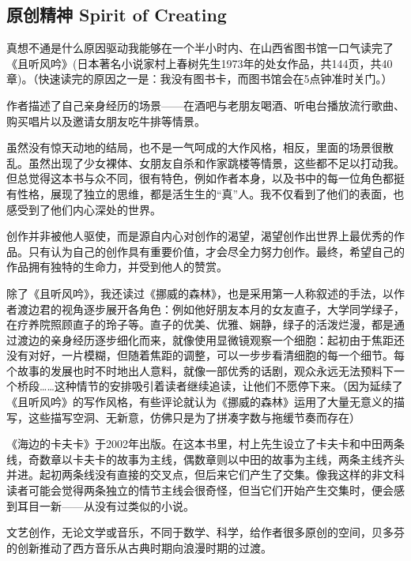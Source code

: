 \hypertarget{ux521bux9020ux7684ux7cbeux795e-spirit-of-creating}{%
\subsection{原创精神 Spirit of Creating }\label{ux521bux9020ux7684ux7cbeux795e-spirit-of-creating}}

真想不通是什么原因驱动我能够在一个半小时内、在山西省图书馆一口气读完了《且听风吟》(日本著名小说家村上春树先生1973年的处女作品，共144页，共40章)。（快速读完的原因之一是：我没有图书卡，而图书馆会在5点钟准时关门。）

作者描述了自己亲身经历的场景——在酒吧与老朋友喝酒、听电台播放流行歌曲、购买唱片以及邀请女朋友吃牛排等情景。

虽然没有惊天动地的结局，也不是一气呵成的大作风格，相反，里面的场景很散乱。虽然出现了少女裸体、女朋友自杀和作家跳楼等情景，这些都不足以打动我。但总觉得这本书与众不同，很有特色，例如作者本身，以及书中的每一位角色都挺有性格，展现了独立的思维，都是活生生的“真”人。我不仅看到了他们的表面，也感受到了他们内心深处的世界。

创作并非被他人驱使，而是源自内心对创作的渴望，渴望创作出世界上最优秀的作品。只有认为自己的创作具有重要价值，才会尽全力努力创作。最终，希望自己的作品拥有独特的生命力，并受到他人的赞赏。

除了《且听风吟》，我还读过《挪威的森林》，也是采用第一人称叙述的手法，以作者渡边君的视角逐步展开各角色：例如他好朋友本月的女友直子，大学同学绿子，在疗养院照顾直子的玲子等。直子的优美、优雅、娴静，绿子的活泼烂漫，都是通过渡边的亲身经历逐步细化而来，就像使用显微镜观察一个细胞：起初由于焦距还没有对好，一片模糊，但随着焦距的调整，可以一步步看清细胞的每一个细节。每个故事的发展也时不时地出人意料，就像一部优秀的话剧，观众永远无法预料下一个桥段……这种情节的安排吸引着读者继续追读，让他们不愿停下来。（因为延续了《且听风吟》的写作风格，有些评论就认为《挪威的森林》运用了大量无意义的描写，这些描写空洞、无新意，仿佛只是为了拼凑字数与拖缓节奏而存在） 

《海边的卡夫卡》于2002年出版。在这本书里，村上先生设立了卡夫卡和中田两条线，奇数章以卡夫卡的故事为主线，偶数章则以中田的故事为主线，两条主线齐头并进。起初两条线没有直接的交叉点，但后来它们产生了交集。像我这样的非文科读者可能会觉得两条独立的情节主线会很奇怪，但当它们开始产生交集时，便会感到耳目一新——从没有过类似的小说。 

文艺创作，无论文学或音乐，不同于数学、科学，给作者很多原创的空间，贝多芬的创新推动了西方音乐从古典时期向浪漫时期的过渡。 

